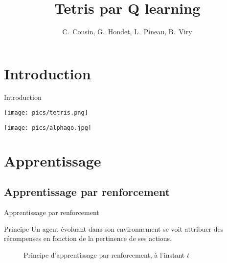 \documentclass[tikz, footheight=2em]{beamer}
\title{Tetris par Q learning}
\author{C.~Cousin, G.~Hondet, L.~Pineau, B.~Viry}
\date{}
\begin{document}
\frame{\titlepage}


\section*{Introduction}
\begin{frame}[c]{Introduction}
  \begin{center}
    \begin{minipage}[c]{0.4\linewidth}
      \texttt{[image: pics/tetris.png]}
    \end{minipage}
    \begin{minipage}[c]{0.4\linewidth}
      \texttt{[image: pics/alphago.jpg]}
    \end{minipage}
  \end{center}
\end{frame}

\section{Apprentissage}
\subsection{Apprentissage par renforcement}
\begin{frame}{Apprentissage par renforcement}
  \begin{block}{Principe}
    Un agent évoluant dans son environnement se voit attribuer des
    récompenses en fonction de la pertinence de ses actions.
    \begin{figure}[h]
      \begin{center}
      \end{center}
      \caption{Principe d'apprentissage par renforcement, à l'instant \(t\)}
      \label{fig:reinforcement_learning}
    \end{figure}
  \end{block}
\end{frame}
\end{document}
